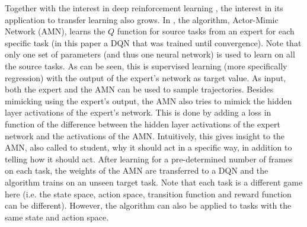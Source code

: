 \documentclass[a4paper, 11pt]{article}
\begin{document}
Together with the interest in deep reinforcement learning \citep{Mnih2015Human-levelLearning,Mnih2016AsynchronousLearning}, the interest in its application to transfer learning also grows. In \cite{DBLP:journals/corr/ParisottoBS15}, the algorithm, Actor-Mimic Network (AMN), learns the $Q$ function for source tasks from an expert for each specific task (in this paper a DQN that was trained until convergence).
Note that only one set of parameters (and thus one neural network) is used to learn on all the source tasks. As can be seen, this is supervised learning (more specifically regression) with the output of the expert's network as target value. As input, both the expert and the AMN can be used to sample trajectories.
Besides mimicking using the expert's output, the AMN also tries to mimick the hidden layer activations of the expert's network. This is done by adding a loss in function of the difference between the hidden layer activations of the expert network and the activations of the AMN. Intuitively, this gives insight to the AMN, also called to student, why it should act in a specific way, in addition to telling how it should act.
After learning for a pre-determined number of frames on each task, the weights of the AMN are transferred to a DQN and the algorithm trains on an unseen target task.
Note that each task is a different game here (i.e. the state space, action space, transition function and reward function can be different). However, the algorithm can also be applied to tasks with the same state and action space.
\end{document}
